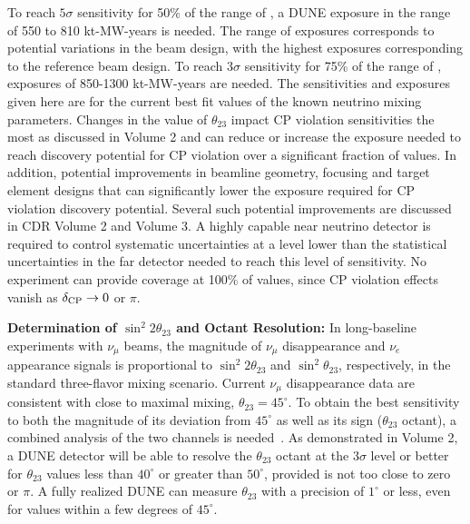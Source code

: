 To reach $5\sigma$ sensitivity for 50\% of the range of \deltacp, a
DUNE exposure in the range of 550 to 810 kt-MW-years is needed. The
range of exposures corresponds to potential variations in the beam
design, with the highest exposures corresponding to the reference beam
design. To reach $3\sigma$ sensitivity for 75\% of
the range of \deltacp, exposures of 850-1300 kt-MW-years are
needed. The sensitivities and exposures given here are for the current
best fit values of the known neutrino mixing parameters. Changes in
the value of $\theta_{23}$ impact CP violation sensitivities the most
as discussed in Volume 2 and can reduce or increase the exposure
needed to reach discovery potential for CP violation over a
significant fraction of \deltacp values. In addition, potential
improvements in beamline geometry, focusing and target element designs
that can significantly lower the exposure required for CP violation
discovery potential. Several such potential improvements are discussed
in CDR Volume 2 and Volume 3. A highly capable near neutrino detector
is required to control systematic uncertainties at a level lower than
the statistical uncertainties in the far detector needed to reach this
level of sensitivity.  No experiment can provide coverage at 100\% of
\deltacp values, since CP violation effects vanish as $\mdeltacp\to 0$
or $\pi$.

\textbf{\boldmath Determination of $\sin^2{2\theta_{23}}$ and Octant
  Resolution:} In long-baseline experiments with $\nu_\mu$ beams, the
magnitude of $\nu_\mu$ disappearance and $\nu_e$ appearance signals is
proportional to $\sin^2{2\theta_{23}}$ and $\sin^2{\theta_{23}}$,
respectively, in the standard three-flavor mixing scenario.  Current
$\nu_\mu$ disappearance data are consistent with close to maximal
mixing, $\theta_{23} = 45^\circ$.  To obtain the best sensitivity to
both the magnitude of its deviation from $45^\circ$ as well as its
sign ($\theta_{23}$ octant), a combined analysis of the two channels
is needed~\cite{Huber:2010dx}.  As demonstrated in Volume 2, a
 DUNE detector will be able to resolve the $\theta_{23}$
octant at the $3\sigma$ level or better for $\theta_{23}$ values less
than $40^\circ$ or greater than $50^\circ$, provided \deltacp is not
too close to zero or $\pi$.  A fully realized DUNE can measure
$\theta_{23}$ with a precision of $1^\circ$ or less, even for values
within a few degrees of $45^\circ$.


